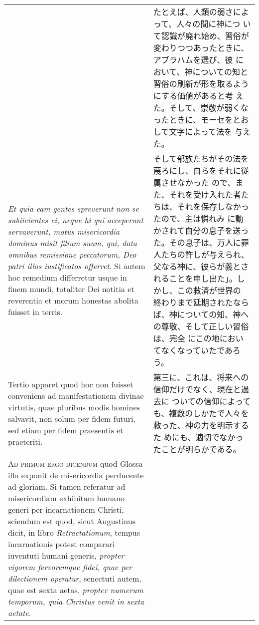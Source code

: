 \documentclass[10pt]{jsarticle} %
\begin{document}
\begin{longtable}{p{21em}p{21em}}
&

たとえば、人類の弱さによって、人々の間に神につ
 いて認識が廃れ始め、習俗が変わりつつあったときに、アブラハムを選び、彼
 において、神についての知と習俗の刷新が形を取るようにする価値があると考
 えた。そして、崇敬が弱くなったときに、モーセをとおして文字によって法を
 与えた。
\\


{\itshape Et quia eam
gentes spreverunt non se subiicientes ei, neque hi qui acceperunt
servaverunt, motus misericordia dominus misit filium suum, qui, data
omnibus remissione peccatorum, Deo patri illos iustificatos offerret}. Si
autem hoc remedium differretur usque in finem mundi, totaliter Dei
notitia et reverentia et morum honestas abolita fuisset in
terris. 



&

そして部族たちがその法を蔑ろにし、自らをそれに従属させなかった
 ので、また、それを受け入れた者たちは、それを保存しなかったので、主は憐れみ
 に動かされて自分の息子を送った。その息子は、万人に罪人たちの許しが与えられ、
 父なる神に、彼らが義とされることを申し出た」。しかし、この救済が世界の
 終わりまで延期されたならば、神についての知、神への尊敬、そして正しい習俗は、完全
 にこの地においてなくなっていたであろう。

\\


Tertio apparet quod hoc non fuisset conveniens ad
manifestationem divinae virtutis, quae pluribus modis homines salvavit,
non solum per fidem futuri, sed etiam per fidem praesentis et
praeteriti.


&


第三に、これは、将来への信仰だけでなく、現在と過去に
 ついての信仰によっても、複数のしかたで人々を救った、神の力を明示するた
 めにも、適切でなかったことが明らかである。


\\


{\scshape Ad primum ergo dicendum} quod Glossa illa
exponit de misericordia perducente ad gloriam. Si tamen referatur ad
misericordiam exhibitam humano generi per incarnationem Christi,
sciendum est quod, sicut Augustinus dicit, in libro {\itshape Retractationum},
tempus incarnationis potest comparari iuventuti humani generis, {\itshape propter
vigorem fervoremque fidei, quae per dilectionem operatur}, senectuti
autem, quae est sexta aetas, {\itshape propter numerum temporum, quia Christus
venit in sexta aetate}. 


&


\end{longtable}
\end{document}
